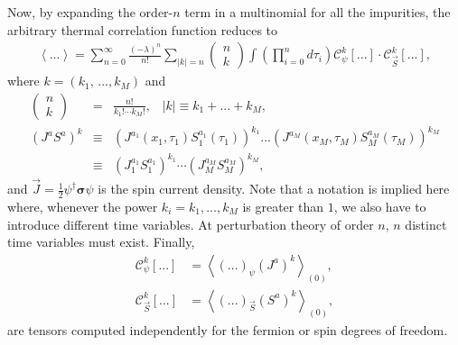 \documentclass[aps,prb,twocolumn,superscriptaddress]{revtex4-1}
\begin{document}
\begin{widetext}
Now, by expanding the order-$n$ term in a multinomial for all the impurities, the arbitrary thermal correlation function reduces to
\begin{eqnarray}
\left\langle ...\right\rangle =\sum_{n=0}^{\infty}\frac{\left(-\lambda\right)^{n}}{n!}\sum_{\left|k\right|=n}\left(\begin{array}{c}
n\\
k
\end{array}\right)\int\left(\prod_{i=0}^{n}d\tau_{i}\right)\mathcal{C}_{\psi}^{k}\left[...\right]\cdot\mathcal{C}_{\vec{S}}^{k}\left[...\right],
\end{eqnarray}
where $k=\left(k_{1},\,...,k_{M}\right)$ and
\begin{eqnarray}
\left(\begin{array}{c}
n\\
k
\end{array}\right)&=&\frac{n!}{k_{1}!\cdots k_{M}!},\;\;\;\left|k\right|\equiv k_{1}+...+k_{M}, \\ 
\left(J^{a}S^{a}\right)^{k}&\equiv&\left(J^{a_{1}}\left(x_{1},\tau_{1}\right)S_{1}^{a_{1}}\left(\tau_{1}\right)\right)^{k_{1}}...\left(J^{a_{M}}\left(x_{M},\tau_{M}\right)S_{M}^{a_{M}}\left(\tau_{M}\right)\right)^{k_{M}} \\ 
&\equiv&\left(J_{1}^{a_{1}}S_{1}^{a_{1}}\right)^{k_{1}}\cdots\left(J_{M}^{a_{M}}S_{M}^{a_{M}}\right)^{k_{M}},
\end{eqnarray}
and $\vec{J}=\frac{1}{2}\psi^{\dagger}\bm{\sigma}\psi$ is the spin current density. Note that a notation is implied here where, whenever the power $k_i=k_1,...,k_M$ is greater than $1$, we also have to introduce different time variables. At perturbation theory of order $n$, $n$ distinct time variables must exist. Finally,
\begin{eqnarray}
\mathcal{C}_{\psi}^{k}\left[...\right]&=\left\langle \left(...\right)_{\psi}\left(J^{a}\right)^{k}\right\rangle _{(0)},\\\mathcal{C}_{\vec{S}}^{k}\left[...\right]&=\left\langle \left(...\right)_{\vec{S}}\left(S^{a}\right)^{k}\right\rangle _{(0)},
\end{eqnarray}
are tensors computed independently for the fermion or spin degrees of freedom.


\end{widetext}
\end{document}
